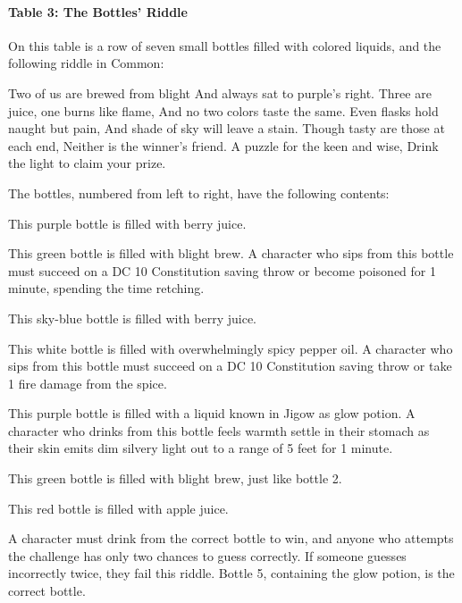 \documentclass[10pt,a4paper,twoside,bg=print,twocolumn,openany,nodeprecatedcode]{dndbook}
\begin{document}
\paragraph{Table 3: The Bottles' Riddle}
On this table is a row of seven small bottles filled with colored liquids, and the following riddle in Common:

\begin{DndReadAloud}{}
Two of us are brewed from blight And always sat to purple's right. Three are juice, one burns like flame, And no two colors taste the same. Even flasks hold naught but pain, And shade of sky will leave a stain. Though tasty are those at each end, Neither is the winner's friend. A puzzle for the keen and wise, Drink the light to claim your prize.

\end{DndReadAloud}

The bottles, numbered from left to right, have the following contents:


\begin{description}[nolistsep]
\item[Bottle 1.]
This purple bottle is filled with berry juice.
\item[Bottle 2.]
This green bottle is filled with blight brew. A character who sips from this bottle must succeed on a DC 10 Constitution saving throw or become poisoned for 1 minute, spending the time retching.
\item[Bottle 3.]
This sky-blue bottle is filled with berry juice.
\item[Bottle 4.]
This white bottle is filled with overwhelmingly spicy pepper oil. A character who sips from this bottle must succeed on a DC 10 Constitution saving throw or take 1 fire damage from the spice.
\item[Bottle 5.]
This purple bottle is filled with a liquid known in Jigow as glow potion. A character who drinks from this bottle feels warmth settle in their stomach as their skin emits dim silvery light out to a range of 5 feet for 1 minute.
\item[Bottle 6.]
This green bottle is filled with blight brew, just like bottle 2.
\item[Bottle 7.]
This red bottle is filled with apple juice.
\end{description}

A character must drink from the correct bottle to win, and anyone who attempts the challenge has only two chances to guess correctly. If someone guesses incorrectly twice, they fail this riddle. Bottle 5, containing the glow potion, is the correct bottle.
\end{document}
